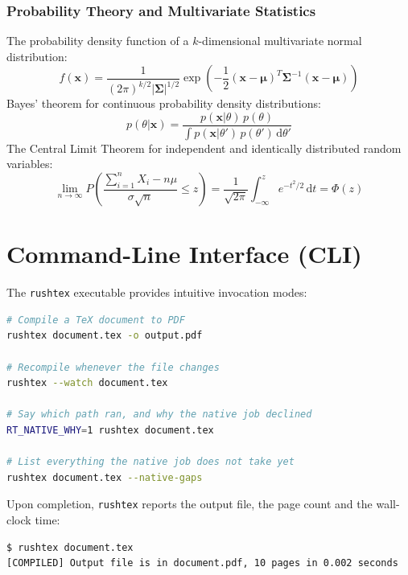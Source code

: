 \documentclass[11pt, a4paper]{article}
\begin{document}
\subsubsection{Probability Theory and Multivariate Statistics}
The probability density function of a $k$-dimensional multivariate normal distribution:
\begin{equation}
f(\mathbf{x}) = \frac{1}{(2\pi)^{k/2} |\boldsymbol{\Sigma}|^{1/2}} \exp\left( -\frac{1}{2} (\mathbf{x} - \boldsymbol{\mu})^T \boldsymbol{\Sigma}^{-1} (\mathbf{x} - \boldsymbol{\mu}) \right)
\end{equation}
Bayes' theorem for continuous probability density distributions:
\begin{equation}
p(\theta | \mathbf{x}) = \frac{p(\mathbf{x} | \theta) \, p(\theta)}{\int p(\mathbf{x} | \theta') \, p(\theta') \, \mathrm{d}\theta'}
\end{equation}
The Central Limit Theorem for independent and identically distributed random variables:
\begin{equation}
\lim_{n \to \infty} P\left( \frac{\sum_{i=1}^n X_i - n\mu}{\sigma \sqrt{n}} \le z \right) = \frac{1}{\sqrt{2\pi}} \int_{-\infty}^z e^{-t^2/2} \, \mathrm{d}t = \Phi(z)
\end{equation}

\bigskip

\section{Command-Line Interface (CLI)}
The \texttt{rushtex} executable provides intuitive invocation modes:

\begin{lstlisting}[language=bash]
# Compile a TeX document to PDF
rushtex document.tex -o output.pdf

# Recompile whenever the file changes
rushtex --watch document.tex

# Say which path ran, and why the native job declined
RT_NATIVE_WHY=1 rushtex document.tex

# List everything the native job does not take yet
rushtex document.tex --native-gaps
\end{lstlisting}

Upon completion, \texttt{rushtex} reports the output file, the page count and the wall-clock time:

\begin{verbatim}
$ rushtex document.tex
[COMPILED] Output file is in document.pdf, 10 pages in 0.002 seconds
\end{verbatim}
\end{document}
